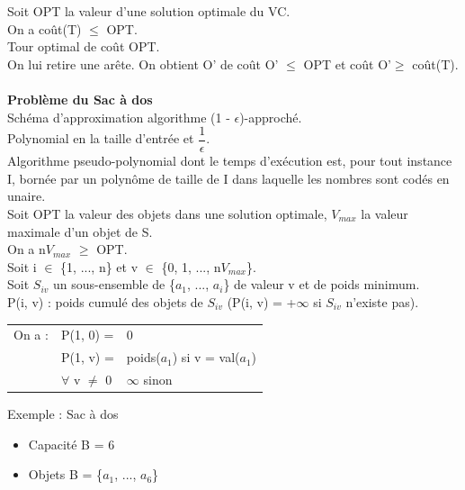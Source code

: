 \documentclass[12pt,a4paper]{article}
\begin{document}
Soit OPT la valeur d'une solution optimale du VC.\\
On a coût(T) $\leq$ OPT.\\
Tour optimal de coût OPT.\\
On lui retire une arête.
On obtient O' de coût O' $\leq$ OPT et coût O'$\geq$ coût(T).\\\\
\textbf{\large Problème du Sac à dos}\\
Schéma d'approximation algorithme (1 - $\epsilon$)-approché.\\
Polynomial en la taille d'entrée et $\dfrac{1}{\epsilon}$.\\
Algorithme pseudo-polynomial dont le temps d'exécution est, pour tout instance I, bornée par un polynôme de taille de I dans laquelle les nombres sont codés en unaire.\\
Soit OPT la valeur des objets dans une solution optimale, $V_{max}$ la valeur maximale d'un objet de S.\\
On a n$V_{max}$ $\geq$ OPT.\\
Soit i $\in$ \{1, ..., n\} et v $\in$ \{0, 1, ..., n$V_{max}$\}.\\
Soit $S_{iv}$ un sous-ensemble de \{$a_1$, ..., $a_i$\} de valeur v et de poids minimum.\\
P(i, v) : poids cumulé des objets de $S_{iv}$ (P(i, v) = +$\infty$ si $S_{iv}$ n'existe pas).\\
\begin{tabular} {lll}
	On a : & P(1, 0) = & 0\\
		   & P(1, v) = & poids($a_1$) si v = val($a_1$)\\
		   & $\forall$ v $\neq$ 0 & $\infty$ sinon
\end{tabular}
Exemple : Sac à dos
\begin{itemize}
	\item Capacité B = 6
	\item Objets B = \{$a_1$, ..., $a_6$\}
\end{itemize}
\end{document}
